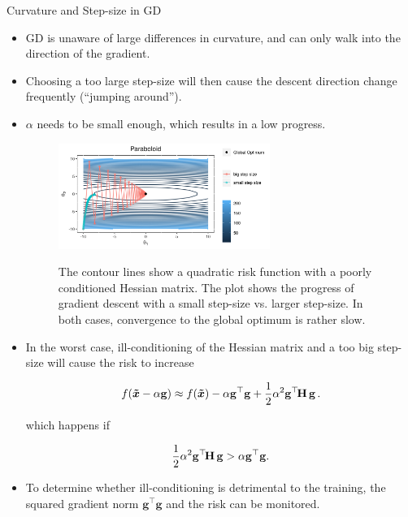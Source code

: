 \begin{vbframe}{Curvature and Step-size in GD}
\begin{itemize}
\item GD is unaware of large differences in curvature, and can only walk into the direction of the gradient.  
\item Choosing a too large step-size will then cause the descent direction change frequently (\enquote{jumping around}).
\item $\alpha$ needs to be small enough, which results in a low progress.

\begin{figure}
	\begin{center}
		\includegraphics[width=0.65\textwidth]{figure_man/big_small_stepsize.png}
	\end{center}
	\tiny{The contour lines show a quadratic risk function with a poorly conditioned Hessian matrix. The plot shows the progress of gradient descent with a small step-size vs. larger step-size. In both cases, convergence to the global optimum is rather slow. \par}
\end{figure}

\framebreak
\item In the worst case, ill-conditioning of the Hessian matrix and a too big step-size will cause the risk to increase

$$
	f(\bm{\tilde{x}}-\alpha \mathbf{g}) \approx f(\bm{\tilde{x}}) - \alpha \mathbf{g}^\top\mathbf{g} + \frac{1}{2}	\alpha^2 \mathbf{g}^\top\!\mathbf{H}\,\mathbf{g}  \,.
$$ 

which happens if 

$$
\frac{1}{2} \alpha^2 \mathbf{g}^\top\!\mathbf{H}\,\mathbf{g} > \alpha \mathbf{g}^\top\mathbf{g}.
$$
\item To determine whether ill-conditioning is detrimental to the training, the squared gradient norm $\mathbf{g}^\top \mathbf{g}$ and the risk %
can be monitored.


\end{itemize}
\end{vbframe}
